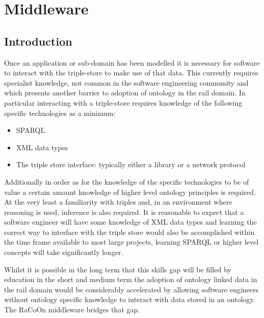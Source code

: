 \chapter{Middleware}\label{ch:middleware}
\section{Introduction}\label{sec:mwintro}
Once an application or sub-domain has been modelled it is necessary for software to interact with the triple-store to make use of that data. This currently requires specialist knowledge, not common in the software engineering community and which presents another barrier to adoption of ontology in the rail domain. In particular interacting with a triple-store requires knowledge of the following specific technologies as a minimum:
\begin{itemize}
    \item SPARQL
    \item XML data types 
    \item The triple store interface: typically either a library or a network protocol
\end{itemize}

Additionally in order as for the knowledge of the specific technologies to be of value a certain amount knowledge of higher level ontology principles is required. At the very least a familiarity with triples and, in an environment where reasoning is used, inference is also required. It is reasonable to expect that a software engineer will have some knowledge of XML data types and learning the correct way to interface with the triple store would also be accomplished within the time frame available to most large projects, learning SPARQL or higher level concepts will take significantly longer.

Whilst it is possible in the long term that this skills gap will be filled by education in the short and medium term the adoption of ontology linked data in the rail domain would be considerably accelerated by allowing software engineers without ontology specific knowledge to interact with data stored in an ontology. The RaCoOn middleware bridges that gap.


